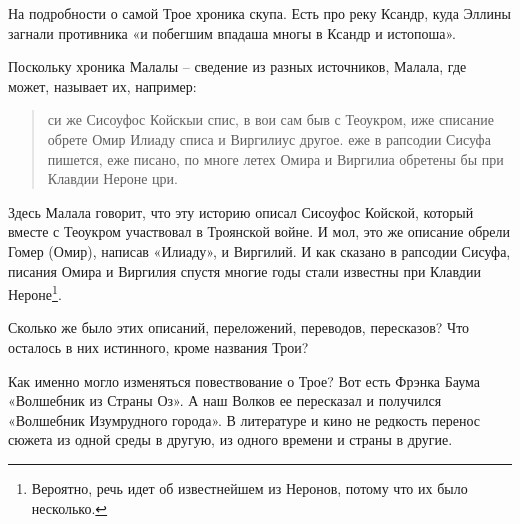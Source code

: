 На подробности о самой Трое хроника скупа. Есть про реку Ксандр, куда Эллины загнали противника «и побегшим впадаша многы в Ксандр и истопоша».

Поскольку хроника Малалы – сведение из разных источников, Малала, где может, называет их, например:

\begin{quotation}
си же Сисоуфос Койскыи спис, в вои сам быв с Теоукром, иже списание обрете Омир Илиаду списа и Виргилиус другое. еже в рапсодии Сисуфа пишется, еже писано, по многе летех Омира и Виргилиа обретены бы при Клавдии Нероне цри.
\end{quotation}

Здесь Малала говорит, что эту историю описал Сисоуфос Койской, который вместе с Теоукром участвовал в Троянской войне. И мол, это же описание обрели Гомер (Омир), написав «Илиаду», и Виргилий. И как сказано в рапсодии Сисуфа, писания Омира и Виргилия спустя многие годы стали известны при Клавдии Нероне\footnote{Вероятно, речь идет об известнейшем из Неронов, потому что их было несколько.}.

Сколько же было этих описаний, переложений, переводов, пересказов? Что осталось в них истинного, кроме названия Трои? 

Как именно могло изменяться повествование о Трое? Вот есть Фрэнка Баума «Волшебник из Страны Оз». А наш Волков ее пересказал и получился «Волшебник Изумрудного города». В литературе и кино не редкость перенос сюжета из одной среды в другую, из одного времени и страны в другие.
